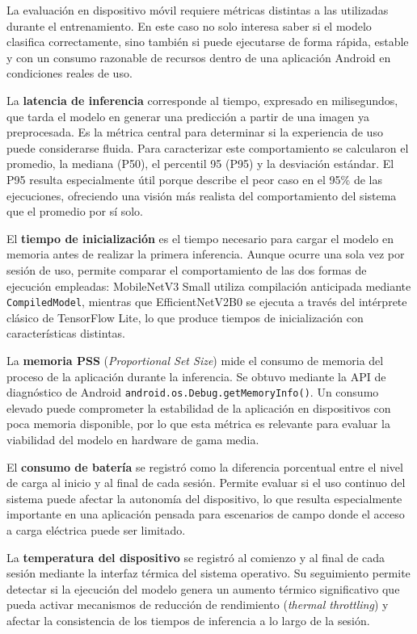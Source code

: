 La evaluación en dispositivo móvil requiere métricas distintas a las utilizadas durante el entrenamiento. En este caso no solo
interesa saber si el modelo clasifica correctamente, sino también si puede ejecutarse de forma rápida, estable y con un consumo
razonable de recursos dentro de una aplicación Android en condiciones reales de uso.

La \textbf{latencia de inferencia} corresponde al tiempo, expresado en milisegundos, que tarda el modelo en generar una predicción
a partir de una imagen ya preprocesada. Es la métrica central para determinar si la experiencia de uso puede considerarse fluida.
Para caracterizar este comportamiento se calcularon el promedio, la mediana (P50), el percentil 95 (P95) y la desviación estándar.
El P95 resulta especialmente útil porque describe el peor caso en el 95\% de las ejecuciones, ofreciendo una visión más realista
del comportamiento del sistema que el promedio por sí solo.

El \textbf{tiempo de inicialización} es el tiempo necesario para cargar el modelo en memoria antes de realizar la primera
inferencia. Aunque ocurre una sola vez por sesión de uso, permite comparar el comportamiento de las dos formas de ejecución
empleadas: MobileNetV3 Small utiliza compilación anticipada mediante \texttt{CompiledModel}, mientras que EfficientNetV2B0 se
ejecuta a través del intérprete clásico de TensorFlow Lite, lo que produce tiempos de inicialización con características
distintas.

La \textbf{memoria PSS} (\textit{Proportional Set Size}) mide el consumo de memoria del proceso de la aplicación durante la
inferencia. Se obtuvo mediante la API de diagnóstico de Android \texttt{android.os.Debug.getMemoryInfo()}. Un consumo elevado
puede comprometer la estabilidad de la aplicación en dispositivos con poca memoria disponible, por lo que esta métrica es
relevante para evaluar la viabilidad del modelo en hardware de gama media.

El \textbf{consumo de batería} se registró como la diferencia porcentual entre el nivel de carga al inicio y al final de cada
sesión. Permite evaluar si el uso continuo del sistema puede afectar la autonomía del dispositivo, lo que resulta especialmente
importante en una aplicación pensada para escenarios de campo donde el acceso a carga eléctrica puede ser limitado.

La \textbf{temperatura del dispositivo} se registró al comienzo y al final de cada sesión mediante la interfaz térmica del sistema
operativo. Su seguimiento permite detectar si la ejecución del modelo genera un aumento térmico significativo que pueda activar
mecanismos de reducción de rendimiento (\textit{thermal throttling}) y afectar la consistencia de los tiempos de inferencia a lo
largo de la sesión.

